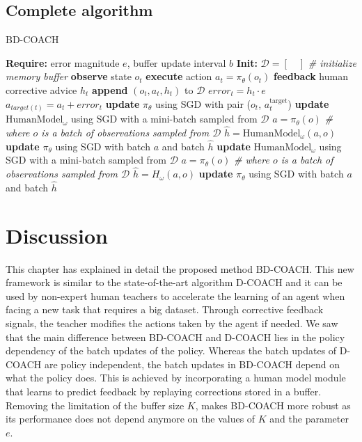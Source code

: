 \subsection*{Complete algorithm}

\begin{algorithm}[H]
\caption{BD-COACH}\label{algorithm:BD-COACH}
\begin{algorithmic}[1]
\State \textbf{Require:} error magnitude $e$, buffer update interval $b$
\State \textbf{Init:} $\mathcal{D} = [\quad]$  \emph{\# initialize memory buffer}
\State \textbf{observe} state $o_{t}$
\State \textbf{execute} action $a_{t}=\pi_{\theta}(o_{t})$
\State \textbf{feedback} human corrective advice $h_{t}$
\State \textbf{append} $(o_{t}, a_{t}, h_{t})$ to $\mathcal{D}$
\State $\mathit{error}_{t} = h_{t}\cdot e$
\State $a_{target(t)} = a_{t} + \mathit{error}_{t}$
\State \textbf{update} $\pi_\theta$ using SGD with pair ($o_{t}$, $a^{\text{target}}_{t}$)
\State \textbf{update} $\text{HumanModel}_\omega$ using SGD with a mini-batch sampled from $\mathcal{D}$
\State  $a=\pi_{\theta}(o)$ \emph{\# where $o$ is a batch of observations sampled from $\mathcal{D}$}
\State  $\hat{h}=\text{HumanModel}_\omega(a, o)$
\State \textbf{update} $\pi_\theta$ using SGD with batch $a$ and batch $\hat{h}$
\EndIf
{}
\State \textbf{update} $\text{HumanModel}_\omega$ using SGD with a mini-batch sampled from $\mathcal{D}$
\State  $a=\pi_{\theta}(o)$ \emph{\# where $o$ is a batch of observations sampled from $\mathcal{D}$}
\State  $\hat{h}=H_\omega(a, o)$
\State \textbf{update} $\pi_{\theta}$ using SGD with batch $a$ and batch $\hat{h}$
\EndIf
\EndFor
\end{algorithmic}
\label{al:D-COACH with HM}
\end{algorithm}











\section{Discussion}
\label{section:Algorithm-Discussion}
This chapter has explained in detail the proposed method BD-COACH. This new framework is similar to the state-of-the-art algorithm D-COACH and it can be used by non-expert human teachers to accelerate the learning of an agent when facing a new task that requires a big dataset. Through corrective feedback signals, the teacher modifies the actions taken by the agent if needed. We saw that the main difference between BD-COACH and D-COACH lies in the policy dependency of the batch updates of the policy. Whereas the batch updates of D-COACH are policy independent, the batch updates in BD-COACH depend on what the policy does. This is achieved by incorporating a human model module that learns to predict feedback by replaying corrections stored in a buffer. Removing the limitation of the buffer size $K$, makes BD-COACH more robust as its performance does not depend anymore on the values of $K$ and the parameter $e$.

